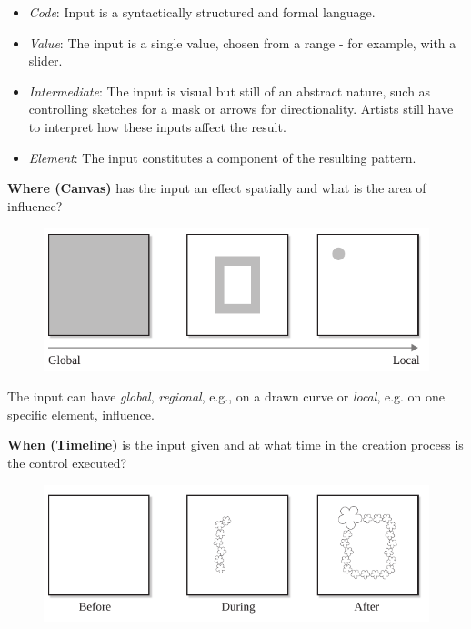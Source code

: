 \begin{itemize}
    \item \textit{Code}: Input is a syntactically structured and formal language.
    \item \textit{Value}: The input is a single value, chosen from a range - for example, with a slider.
    \item \textit{Intermediate}: The input is visual but still of an abstract nature, such as controlling sketches for a mask or arrows for directionality. Artists still have to interpret how these inputs affect the result.
    \item \textit{Element}: The input constitutes a component of the resulting pattern.
\end{itemize}

\noindent\textbf{Where (Canvas)} has the input an effect spatially and what is the area of influence? 
\begin{figure}[hbt]
    \centering
        \includegraphics[width=\controlParamsFigWidth\linewidth]{figures/control_paradigms/where.pdf}
\end{figure}

The input can have \textit{global}, \textit{regional}, e.g., on a drawn curve or \textit{local}, e.g. on one specific element, influence.



\textbf{When (Timeline)} is the input given and at what time in the creation process is the control executed? 
\begin{figure}[H]
    \centering
        \includegraphics[width=\controlParamsFigWidth\linewidth]{figures/control_paradigms/when.pdf}
\end{figure}

